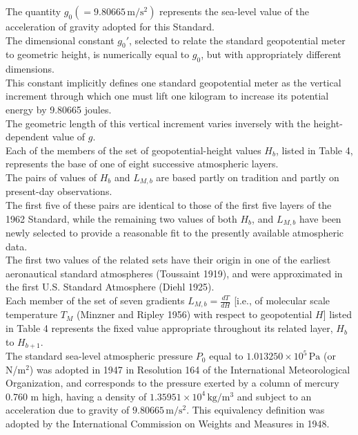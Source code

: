 \documentclass{article}
\begin{document}
The quantity \(g_0 (= 9.80665 \, \mathrm{m/s^2})\) represents the sea-level value of the acceleration of gravity adopted for this Standard.\\

The dimensional constant \(g_0'\), selected to relate the standard geopotential meter to geometric height, is numerically equal to \(g_0\), but with appropriately different dimensions.\\
This constant implicitly defines one standard geopotential meter as the vertical increment through which one must lift one kilogram to increase its potential energy by 9.80665 joules.\\
The geometric length of this vertical increment varies inversely with the height-dependent value of \(g\).\\

Each of the members of the set of geopotential-height values \(H_b\), listed in Table 4, represents the base of one of eight successive atmospheric layers.\\
The pairs of values of \(H_b\) and \(L_{M,b}\) are based partly on tradition and partly on present-day observations.\\
The first five of these pairs are identical to those of the first five layers of the 1962 Standard, while the remaining two values of both \(H_b\), and \(L_{M,b}\) have been newly selected to provide a reasonable fit to the presently available atmospheric data.\\
The first two values of the related sets have their origin in one of the earliest aeronautical standard atmospheres (Toussaint 1919), and were approximated in the first U.S. Standard Atmosphere (Diehl 1925).\\

Each member of the set of seven gradients \(L_{M,b} = \frac{dT}{dH}\) [i.e., of molecular scale temperature \(T_M\) (Minzner and Ripley 1956) with respect to geopotential \(H\)] listed in Table 4 represents the fixed value appropriate throughout its related layer, \(H_b\) to \(H_{b+1}\).\\

The standard sea-level atmospheric pressure \(P_0\) equal to \(1.013250 \times 10^{5} \, \mathrm{Pa}\) (or N/m\(^2\)) was adopted in 1947 in Resolution 164 of the International Meteorological Organization, and corresponds to the pressure exerted by a column of mercury 0.760 m high, having a density of \(1.35951 \times 10^{4} \, \mathrm{kg/m^3}\) and subject to an acceleration due to gravity of \(9.80665 \, \mathrm{m/s^2}\).
This equivalency definition was adopted by the International Commission on Weights and Measures in 1948.\\
\end{document}
